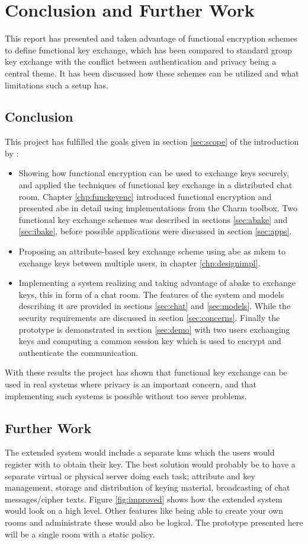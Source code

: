 \chapter{Conclusion and Further Work}\label{cha:conclusion}
This report has presented and taken advantage of functional encryption schemes to define functional key exchange, which has been compared to standard group key exchange with the conflict between authentication and privacy being a central theme. It has been discussed how these schemes can be utilized and what limitations such a setup has.

\section{Conclusion}
This project has fulfilled the goals given in section \ref{sec:scope} of the introduction by :
\begin{itemize}
 \item Showing how functional encryption can be used to exchange keys securely, and applied the techniques of functional key exchange in a distributed chat room. Chapter \ref{chp:funckeyenc} introduced functional encryption and presented \gls{abe} in detail using implementations from the Charm toolbox. Two functional key exchange schemes was described in sections \ref{sec:abake} and \ref{sec:ibake}, before possible applications were discussed in section \ref{sec:apps}.
\item Proposing an attribute-based key exchange scheme using \gls{abe} as m\gls{kem} to exchange keys between multiple users, in chapter \ref{chp:designimpl}.
\item Implementing a system realizing and taking advantage of \gls{abake} to exchange keys, this in form of a chat room. The features of the system and models describing it are provided in sections \ref{sec:chat} and \ref{sec:models}. While the security requirements are discussed in section \ref{sec:concerns}. Finally the prototype is demonstrated in section \ref{sec:demo} with two users exchanging keys and computing a common session key which is used to encrypt and authenticate the communication.
\end{itemize}

With these results the project has shown that functional key exchange can be used in real systems where privacy is an important concern, and that implementing such systems is possible without too sever problems. 

\section{Further Work}
The extended system would include a separate \gls{kms} which the users would register with to obtain their key. The best solution would probably be to have a separate virtual or physical server doing each task; attribute and key management, storage and distribution of keying material, broadcasting of chat messages/cipher texts. Figure \ref{fig:improved} shows how the extended system would look on a high level. Other features like being able to create your own rooms and administrate these would also be logical. The prototype presented here will be a single room with a static policy.

